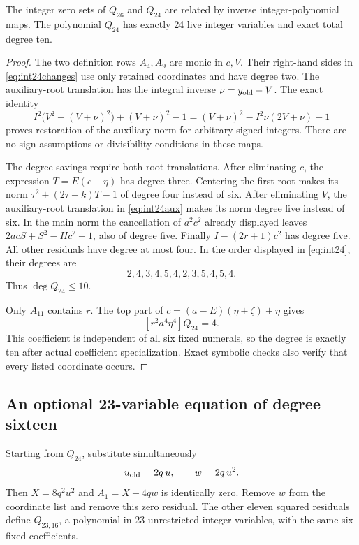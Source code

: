 \begin{theorem}
The integer zero sets of $Q_{26}$ and $Q_{24}$ are related by inverse
integer-polynomial maps.  The polynomial $Q_{24}$ has exactly 24 live
integer variables and exact total degree ten.
\end{theorem}
\begin{proof}
The two definition rows $A_4,A_9$ are monic in $c,V$.  Their right-hand
sides in \eqref{eq:int24changes} use only retained coordinates and have
degree two.  The auxiliary-root translation has the integral inverse
$\nu=y_{\rm old}-V$.  The exact identity
\[
 I^2\bigl(V^2-(V+\nu)^2\bigr)+(V+\nu)^2-1
  =(V+\nu)^2-I^2\nu(2V+\nu)-1
\]
proves restoration of the auxiliary norm for arbitrary signed integers.
There are no sign assumptions or divisibility conditions in these maps.

The degree savings require both root translations.  After eliminating
$c$, the expression $T=E(c-\eta)$ has degree three.  Centering the first
root makes its norm $\tau^2+(2\tau-k)T-1$ of degree four instead of six.
After eliminating $V$, the auxiliary-root translation in
\eqref{eq:int24aux} makes its norm degree five instead of six.  In the
main norm the cancellation of $a^2c^2$ already displayed leaves
$2acS+S^2-Hc^2-1$, also of degree five.  Finally
$I-(2r+1)c^2$ has degree five.  All other residuals have degree at most
four.  In the order displayed in \eqref{eq:int24}, their degrees are
\[
 2,4,3,4,5,4,2,3,5,4,5,4.
\]
Thus $\deg Q_{24}\le10$.

Only $A_{11}$ contains $r$.  The top part of
$c=(a-E)(\eta+\zeta)+\eta$ gives
\[
 [r^2a^4\eta^4]Q_{24}=4.
\]
This coefficient is independent of all six fixed numerals, so the degree
is exactly ten after actual coefficient specialization.  Exact symbolic
checks also verify that every listed coordinate occurs.
\end{proof}

\subsection{An optional 23-variable equation of degree sixteen}

Starting from $Q_{24}$, substitute simultaneously
\begin{equation}
 u_{\rm old}=2q\,u,\qquad w=2q\,u^2.
 \label{eq:int23dyadic}
\end{equation}
Then $X=8q^2u^2$ and $A_1=X-4qw$ is identically zero.  Remove $w$ from
the coordinate list and remove this zero residual.  The other eleven
squared residuals define $Q_{23,16}$, a polynomial in 23 unrestricted
integer variables, with the same six fixed coefficients.

